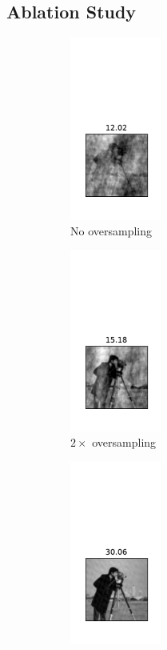 \subsection{Ablation Study}

\begin{figure}
	\begin{subfigure}{.24\textwidth}
		\centering
		\includegraphics[width=3cm, trim= 10 35 10 120]{data/zero-oversampling.pdf}
		\caption{No oversampling}
	\end{subfigure}
	\begin{subfigure}{.24\textwidth}
		\centering
		\includegraphics[width=3cm, trim= 10 35 10 120]{data/two-times-oversampling.pdf}
		\caption{$2\times$ oversampling}
	\end{subfigure}
	\begin{subfigure}{.24\textwidth}
		\centering
		\includegraphics[width=3cm, trim= 10 35 10 120]{data/four-times-oversampling.pdf}

\end{subfigure}
\end{figure}
